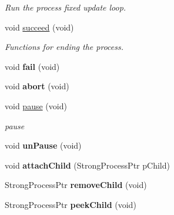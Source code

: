 \begin{Indent}
\begin{DoxyCompactItemize}
\begin{DoxyCompactList}\small\item\em Run the process fixed update loop. \end{DoxyCompactList}\item 
\mbox{\label{classrev_1_1_process_a3479df51a2922811dc5b6a5e7b6ef1e8}} 
void \mbox{\hyperlink{classrev_1_1_process_a3479df51a2922811dc5b6a5e7b6ef1e8}{succeed}} (void)
\begin{DoxyCompactList}\small\item\em Functions for ending the process. \end{DoxyCompactList}\item 
\mbox{\label{classrev_1_1_process_aa35a58e836b315dc4b26728724af3cb1}} 
void {\bfseries fail} (void)
\item 
\mbox{\label{classrev_1_1_process_a02a1baf1129e86e9b0b0bd3cfa87e64d}} 
void {\bfseries abort} (void)
\item 
\mbox{\label{classrev_1_1_process_a31a5075acd7bb3f96b25c95532054bed}} 
void \mbox{\hyperlink{classrev_1_1_process_a31a5075acd7bb3f96b25c95532054bed}{pause}} (void)
\begin{DoxyCompactList}\small\item\em pause \end{DoxyCompactList}\item 
\mbox{\label{classrev_1_1_process_aee68637d1d2d93e5842230ec1fdb1b39}} 
void {\bfseries un\+Pause} (void)
\item 
\mbox{\label{classrev_1_1_process_ad3abe3b70c6975fc107f3dd5b0bc0e05}} 
void {\bfseries attach\+Child} (Strong\+Process\+Ptr p\+Child)
\item 
\mbox{\label{classrev_1_1_process_ab8f24f7f2013977d49bcdbf9b2ed6e09}} 
Strong\+Process\+Ptr {\bfseries remove\+Child} (void)
\item 
\mbox{\label{classrev_1_1_process_ad5d95593ee0104de06251c3071914e81}} 
Strong\+Process\+Ptr {\bfseries peek\+Child} (void)
\end{DoxyCompactItemize}
\end{Indent}
